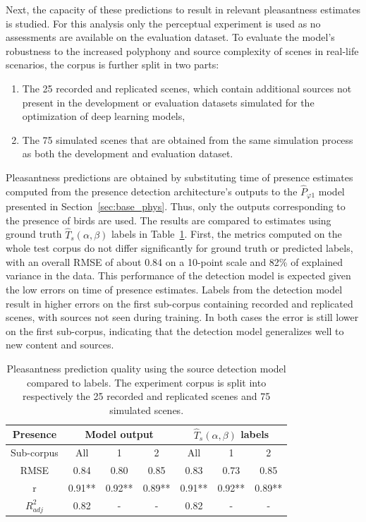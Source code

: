 \documentclass[11pt,a4paper]{article}
\begin{document}
Next, the capacity of these predictions to result in relevant pleasantness estimates is studied. For this analysis only the perceptual experiment is used as no assessments are available on the evaluation dataset. To evaluate the model's robustness to the increased polyphony and source complexity of scenes in real-life scenarios, the corpus is further split in two parts:
\begin{enumerate}
\item The 25 recorded and replicated scenes, which contain additional sources not present in the development or evaluation datasets simulated for the optimization of deep learning models,
\item The 75 simulated scenes that are obtained from the same simulation process as both the development and evaluation dataset.
\end{enumerate}
Pleasantness predictions are obtained by substituting time of presence estimates computed from the presence detection architecture's outputs to the $\hat P_{\varphi 1}$ model presented in Section~\ref{sec:base_phys}. Thus, only the outputs corresponding to the presence of birds are used. The results are compared to estimates using ground truth $\hat T_s(\alpha, \beta)$ labels in Table~\ref{tab:pppred}. First, the metrics computed on the whole test corpus do not differ significantly for ground truth or predicted labels, with an overall RMSE of about 0.84 on a 10-point scale and 82\% of explained variance in the data. This performance of the detection model is expected given the low errors on time of presence estimates. Labels from the detection model result in higher errors on the first sub-corpus containing recorded and replicated scenes, with sources not seen during training. In both cases the error is still lower on the first sub-corpus, indicating that the detection model generalizes well to new content and sources.\\

\begin{table}[t]
\centering
\caption{Pleasantness prediction quality using the source detection model compared to labels. The experiment corpus is split into respectively the 25 recorded and replicated scenes and 75 simulated scenes.}
\label{tab:pppred}
\begin{tabular}{ c | c c c | c c c }
\hline
	Presence & \multicolumn{3}{|c}{Model output} & \multicolumn{3}{|c}{$\hat T_s(\alpha, \beta)$ labels} \\ \hline
	Sub-corpus & All & 1 & 2 & All & 1 & 2 \\ \hline
	RMSE & 0.84 & 0.80 & 0.85 & 0.83 & 0.73 & 0.85 \\ \hline
	r & 0.91** & 0.92** & 0.89** & 0.91** & 0.92** & 0.89** \\ \hline
	$R^2_{adj}$ & 0.82 & - & - & 0.82 & - & - \\ \hline
\end{tabular}
\end{table}
\end{document}
